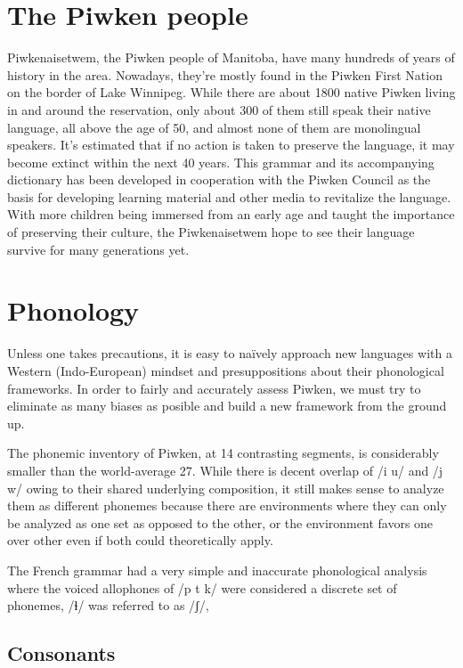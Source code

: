 \documentclass[smallroyalvopaper,9pt]{memoir}
\newcommand{\langeng}{Piwken}
\begin{document}
\newpage

\mainmatter

\chapter{The Piwken people}

Piwkenaisetwem, the Piwken people of Manitoba, have many hundreds of years of history in the area. Nowadays, they're mostly found in the Piwken First Nation on the border of Lake Winnipeg. While there are about 1800 native Piwken living in and around the reservation, only about 300 of them still speak their native language, all above the age of 50, and almost none of them are monolingual speakers. It's estimated that if no action is taken to preserve the language, it may become extinct within the next 40 years. This grammar and its accompanying dictionary has been developed in cooperation with the Piwken Council as the basis for developing learning material and other media to revitalize the language. With more children being immersed from an early age and taught the importance of preserving their culture, the Piwkenaisetwem hope to see their language survive for many generations yet.

\chapter{Phonology}

Unless one takes precautions, it is easy to naïvely approach new languages with a Western (Indo-European) mindset and presuppositions about their phonological frameworks. In order to fairly and accurately assess \langeng{}, we must try to eliminate as many biases as posible and build a new framework from the ground up.

The phonemic inventory of \langeng{}, at 14 contrasting segments, is considerably smaller than the world-average 27. While there is decent overlap of /i u/ and /j w/ owing to their shared underlying composition, it still makes sense to analyze them as different phonemes because there are environments where they can only be analyzed as one set as opposed to the other, or the environment favors one over other even if both could theoretically apply.

The French grammar had a very simple and inaccurate phonological analysis where the voiced allophones of /p t k/ were considered a discrete set of phonemes, /ɬ/ was referred to as /ʃ/, 

\section{Consonants}
\end{document}
